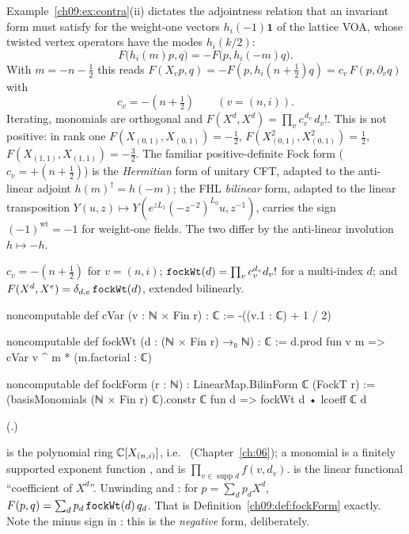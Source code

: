 Example~\ref{ch09:ex:contra}(ii) dictates the adjointness relation that an invariant form must
satisfy for the weight-one vectors $h_i(-1)\mathbf1$ of the lattice VOA, whose twisted vertex
operators have the modes $h_i(k/2)$:
\begin{equation}\label{ch09:eq:hadj}
F\big(h_i(m)p,q\big)=-F\big(p,h_i(-m)q\big).
\end{equation}
With $m=-n-\tfrac12$ this reads $F(X_vp,q)=-F(p,h_i(n+\tfrac12)q)=c_v\,F(p,\partial_vq)$ with
\begin{equation*}
c_v=-(n+\tfrac12)\qquad (v=(n,i)).
\end{equation*}
Iterating, monomials are orthogonal and $F(X^d,X^d)=\prod_v c_v^{\,d_v}\,d_v!$. This is not
positive: in rank one $F(X_{(0,1)},X_{(0,1)})=-\tfrac12$, $F(X_{(0,1)}^2,X_{(0,1)}^2)=\tfrac12$,
$F(X_{(1,1)},X_{(1,1)})=-\tfrac32$. The familiar positive-definite Fock form
($c_v=+(n+\frac12)$) is the \emph{Hermitian} form of unitary CFT, adapted to the anti-linear
adjoint $h(m)^\dagger=h(-m)$; the FHL \emph{bilinear} form, adapted to the linear transposition
$Y(u,z)\mapsto Y(e^{zL_1}(-z^{-2})^{L_0}u,z^{-1})$, carries the sign $(-1)^{\mathrm{wt}}=-1$ for
weight-one fields. The two differ by the anti-linear involution $h\mapsto-h$.

\begin{definition}\label{ch09:def:fockForm}
$c_v=-(n+\tfrac12)$ for $v=(n,i)$; $\lean{fockWt}(d)=\prod_v c_v^{d_v}d_v!$ for a multi-index
$d$; and $F(X^d,X^e)=\delta_{d,e}\,\lean{fockWt}(d)$, extended bilinearly.
\end{definition}
\begin{leancode}
noncomputable def cVar (v : ℕ × Fin r) : ℂ := -((v.1 : ℂ) + 1 / 2)

noncomputable def fockWt (d : (ℕ × Fin r) →₀ ℕ) : ℂ :=
  d.prod fun v m => cVar v ^ m * (m.factorial : ℂ)

noncomputable def fockForm (r : ℕ) : LinearMap.BilinForm ℂ (FockT r) :=
  (basisMonomials (ℕ × Fin r) ℂ).constr ℂ fun d => fockWt d • lcoeff ℂ d
\end{leancode}
(.)
\begin{dictionary}
 is the polynomial ring ${\mathbb{C}}[X_{(n,i)}]$, i.e.\ 
(Chapter~\ref{ch:06}); a monomial is a finitely supported exponent function
, and  is $\prod_{v\in\operatorname{supp}d}f(v,d_v)$.
 is the linear functional ``coefficient of $X^d$''. Unwinding 
and : for $p=\sum_dp_dX^d$, $F(p,q)=\sum_dp_d\,\lean{fockWt}(d)\,q_d$. That is
Definition~\ref{ch09:def:fockForm} exactly. Note the minus sign in : this is the
\emph{negative} form, deliberately.
\end{dictionary}

